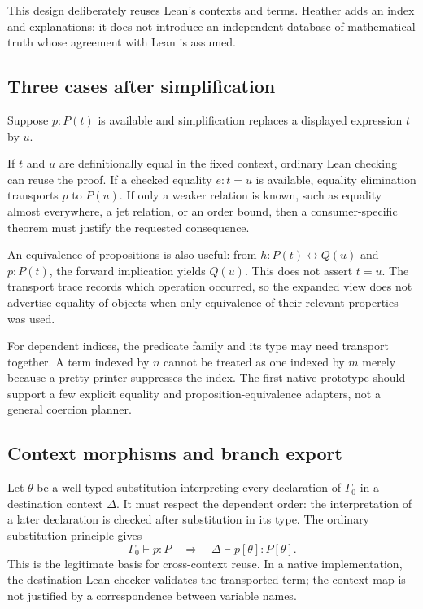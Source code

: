 \documentclass[11pt,letterpaper]{article}
\newcommand{\typing}{\vdash}
\theoremstyle{definition}\newtheorem{definition}[theorem]{Definition}
\theoremstyle{remark}\newtheorem{remark}[theorem]{Remark}
\begin{document}
This design deliberately reuses Lean's contexts and terms. Heather adds an
index and explanations; it does not introduce an independent database of
mathematical truth whose agreement with Lean is assumed.

\subsection{Three cases after simplification}
Suppose $p:P(t)$ is available and simplification replaces a displayed expression
$t$ by $u$.

If $t$ and $u$ are definitionally equal in the fixed context, ordinary Lean
checking can reuse the proof. If a checked equality $e:t=u$ is available,
equality elimination transports $p$ to $P(u)$. If only a weaker relation is
known, such as equality almost everywhere, a jet relation, or an order bound,
then a consumer-specific theorem must justify the requested consequence.

An equivalence of propositions is also useful: from
$h:P(t)\leftrightarrow Q(u)$ and $p:P(t)$, the forward implication yields
$Q(u)$. This does not assert $t=u$. The transport trace records which operation
occurred, so the expanded view does not advertise equality of objects when only
equivalence of their relevant properties was used.

For dependent indices, the predicate family and its type may need transport
together. A term indexed by $n$ cannot be treated as one indexed by $m$ merely
because a pretty-printer suppresses the index. The first native prototype
should support a few explicit equality and proposition-equivalence adapters,
not a general coercion planner.

\subsection{Context morphisms and branch export}
Let $\theta$ be a well-typed substitution interpreting every declaration of
$\Gamma_0$ in a destination context $\Delta$. It must respect the dependent
order: the interpretation of a later declaration is checked after substitution
in its type. The ordinary substitution principle gives
\[
 \Gamma_0\typing p:P
 \quad\Longrightarrow\quad
 \Delta\typing p[\theta]:P[\theta].
\]
This is the legitimate basis for cross-context reuse. In a native implementation,
the destination Lean checker validates the transported term; the context map
is not justified by a correspondence between variable names.
\end{document}
